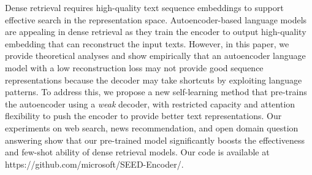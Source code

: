 Dense retrieval requires high-quality text sequence embeddings to support effective search in the representation space. Autoencoder-based language models are appealing in dense retrieval as they train the encoder to output high-quality embedding that can reconstruct the input texts. However,  in this paper, we provide theoretical analyses and show empirically that an autoencoder language model with a low reconstruction loss may not provide good sequence representations because the decoder may take shortcuts by exploiting language patterns. To address this, we propose a new self-learning method that pre-trains the autoencoder using a \textit{weak} decoder, with restricted capacity and attention flexibility to push the encoder to provide better text representations. Our experiments on web search, news recommendation, and open domain question answering show that our pre-trained model significantly boosts the effectiveness and few-shot ability of dense retrieval models. Our code is available at https://github.com/microsoft/SEED-Encoder/.
